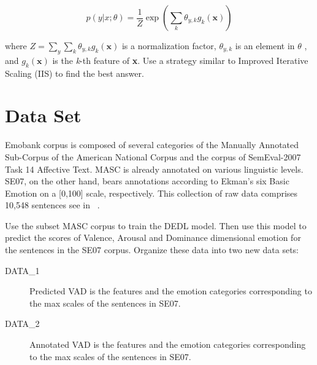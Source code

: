 \begin{equation}\label{eq:max_entropy}
	p(y|x;{\theta}) = \dfrac{1}{Z}
	\exp ( \sum\limits_{k}
	{\theta}_{y,k} 
	g_{k}( \textbf{x})  )
\end{equation}

where $ Z = \sum _{y}
\sum_{k}  {\theta}_{y,k}  g_{k}( \textbf{x}) $
is a normalization factor,
$ {\theta}_{y,k} $ is an element in \textbf {$\theta$} ,
and $ g_{k}( \textbf{x}) $ is the \textit{k}-th feature of\textbf{ x}.
Use a strategy similar to Improved Iterative Scaling (IIS) 
to find the best answer.


\section{Data Set}

Emobank corpus is composed of 
several categories of 
the Manually Annotated Sub-Corpus of the American National Corpus 
and the corpus of SemEval-2007 Task 14 Affective Text. 
MASC is already annotated on various linguistic levels. 
SE07, on the other hand, bears annotations according to 
Ekman’s six Basic Emotion on a [0,100] scale, respectively. 
This collection of raw data comprises 10,548 sentences see in ~.

Use the subset MASC corpus to train the DEDL model.
Then use this model to predict the scores of 
Valence, Arousal and Dominance dimensional emotion
for the sentences in the SE07 corpus.
Organize these data into two new data sets:

\begin{description}
	\item [DATA\_1] Predicted VAD is the features and 
	the emotion categories corresponding to 
	the max scales of the sentences in SE07.
	\item [DATA\_2] Annotated VAD is the features and 
	the emotion categories corresponding to 
	the max scales of the sentences in SE07.
\end{description}

